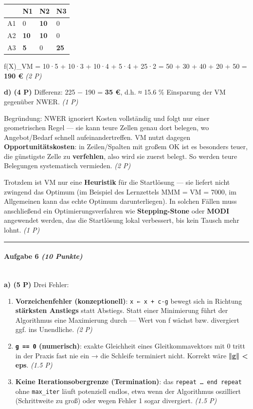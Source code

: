 \documentclass[11pt, a4paper]{article}
\begin{document}
{\small
\begin{tabularx}{\linewidth}{XXXX}
\hline
\rowcolor{tableheadbg}
{\color{white}\textbf{}} & {\color{white}\textbf{N1}} & {\color{white}\textbf{N2}} & {\color{white}\textbf{N3}} \\[2pt]
\hline
\endhead
\hline
\endfoot
A1 & 0 & \textbf{10} & 0 \\
A2 & \textbf{10} & \textbf{10} & 0 \\
A3 & \textbf{5} & 0 & \textbf{25} \\
\end{tabularx}
}


f(X)\_VM = 10·5 + 10·3 + 10·4 + 5·4 + 25·2 = 50 + 30 + 40 + 20 + 50 = \textbf{190 €} \textit{(2 P)}


\textbf{d) (4 P)} Differenz: 225 − 190 = \textbf{35 €}, d.h. ≈ 15.6 \% Einsparung der VM gegenüber NWER. \textit{(1 P)}


Begründung: NWER ignoriert Kosten vollständig und folgt nur einer geometrischen Regel — sie kann teure Zellen genau dort belegen, wo Angebot/Bedarf schnell aufeinandertreffen. VM nutzt dagegen \textbf{Opportunitätskosten}: in Zeilen/Spalten mit großem OK ist es besonders teuer, die günstigste Zelle zu \textbf{verfehlen}, also wird sie zuerst belegt. So werden teure Belegungen systematisch vermieden. \textit{(2 P)}


Trotzdem ist VM nur eine \textbf{Heuristik} für die Startlösung — sie liefert nicht zwingend das Optimum (im Beispiel des Lernzettels MMM = VM = 7000, im Allgemeinen kann das echte Optimum darunterliegen). In solchen Fällen muss anschließend ein Optimierungsverfahren wie \textbf{Stepping-Stone} oder \textbf{MODI} angewendet werden, das die Startlösung lokal verbessert, bis kein Tausch mehr lohnt. \textit{(1 P)}



\noindent\textcolor{rulegray}{\rule{\linewidth}{0.4pt}}


\paragraph{Aufgabe 6 \textit{(10 Punkte)}}\mbox{}\\[2pt]

\textbf{a) (5 P)} Drei Fehler:


\begin{enumerate}
  \item \textbf{Vorzeichenfehler (konzeptionell)}: \texttt{x ← x + c·g} bewegt sich in Richtung \textbf{stärksten Anstiegs} statt Abstiegs. Statt einer Minimierung führt der Algorithmus eine Maximierung durch — Wert von f wächst bzw. divergiert ggf. ins Unendliche. \textit{(2 P)}
  \item \textbf{\texttt{g == 0} (numerisch)}: exakte Gleichheit eines Gleitkommavektors mit 0⃗ tritt in der Praxis fast nie ein → die Schleife terminiert nicht. Korrekt wäre \textbf{‖g‖ < eps}. \textit{(1.5 P)}
  \item \textbf{Keine Iterationsobergrenze (Termination)}: das \texttt{repeat … end repeat} ohne \texttt{max\_iter} läuft potenziell endlos, etwa wenn der Algorithmus oszilliert (Schrittweite zu groß) oder wegen Fehler 1 sogar divergiert. \textit{(1.5 P)}
\end{enumerate}
\end{document}
